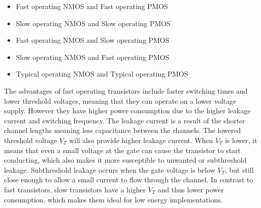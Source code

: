 \begin{itemize}
    \item {}  Fast operating NMOS and Fast operating PMOS 
    \item {}  Slow operating NMOS and Slow operating PMOS 
    \item {}  Fast operating NMOS and Slow operating PMOS 
    \item {}  Slow operating NMOS and Fast operating PMOS 
    \item {}  Typical operating NMOS and Typical operating PMOS 
\end{itemize}

The advantages of fast operating transistors include faster switching times and lower threshold voltages, meaning that they can operate on a lower voltage supply. However they have higher power consumption due to the higher leakage current and switching frequency. The leakage current is a result of the shorter channel lengths meaning less capacitance between the channels. The lowered threshold voltage $V_T$ will also provide higher leakage current. When $V_T$ is lower, it means that even a small voltage at the gate can cause the transistor to start conducting, which also makes it more susceptible to unwanted or subthreshold leakage. Subthreshold leakage occurs when the gate voltage is below $V_T$, but still close enough to allow a small current to flow through the channel. In contrast to fast transistors, slow transistors have a higher $V_T$ and thus lower power consumption, which makes them ideal for low energy implementations.
